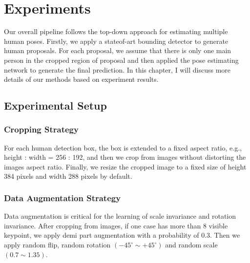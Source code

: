 \chapter{Experiments}
Our overall pipeline follows the top-down approach for estimating multiple human poses.
Firstly, we apply a stateof-art bounding detector to generate human proposals.
For each proposal, we assume that there is only one main person in the cropped region of proposal and then applied the pose estimating network to generate the final prediction.
In this chapter, I will discuss more details of our methods based on experiment results.

\section{Experimental Setup}

\subsection{Cropping Strategy}
For each human detection box, the box is extended to a fixed aspect ratio, e.g., height : width = 256 : 192, and then we crop from images without distorting
the images aspect ratio.
Finally, we resize the cropped image to a fixed size of height 384 pixels and width 288 pixels by default.

\subsection{Data Augmentation Strategy}
Data augmentation is critical for the learning of scale invariance and rotation invariance.
After cropping from images, if one case has more than 8 visible keypoint, we apply demi part augmentation with a probability of 0.3.
Then we apply random flip, random rotation $(−45^{\circ} \sim +45^{\circ})$ and random scale $(0.7 \sim 1.35)$.

